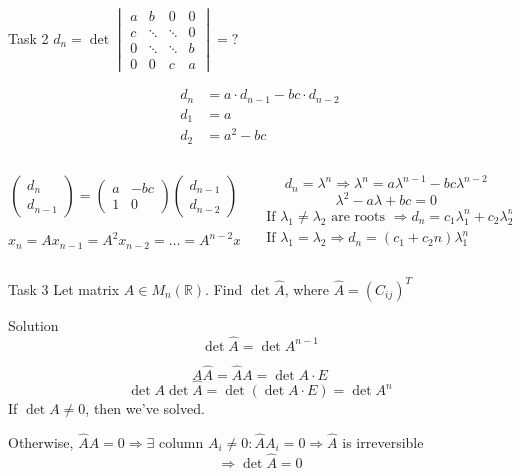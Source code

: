 \documentclass[fullscreen=true, bookmarks=true, hyperref={pdfencoding=unicode}]{beamer}
\begin{document}
\begin{frame}{Task 2}
  $d_n = \det \begin{vmatrix}
    a & b & 0 & 0 \\
    c & \ddots & \ddots & 0 \\
    0 & \ddots & \ddots & b \\
    0 & 0 & c & a 
  \end{vmatrix} = ?$  

  \pause
  \begin{align*}
    d_n &= a \cdot d_{n-1} - bc \cdot d_{n-2} \\
    d_1 &= a \\
    d_2 &= a^2-bc
  \end{align*}
  
  \begin{columns}
    \begin{column}{0.5\paperwidth}
      \pause
      $$\begin{pmatrix}
        d_n \\
        d_{n-1}
      \end{pmatrix} = 
      \begin{pmatrix}
        a & -bc \\
        1 & 0
      \end{pmatrix}  
      \begin{pmatrix}
        d_{n-1} \\
        d_{n-2}
      \end{pmatrix}$$
    
      $$ x_n = A x_{n-1} = A^2 x_{n-2} = \hdots = A^{n-2} x_2 $$          
    \end{column}
    \begin{column}{0.5\paperwidth}
      \pause
      $$d_n = \lambda^n \Rightarrow \lambda^n = a \lambda^{n-1} - bc \lambda^{n-2}$$
      $$\lambda^2 - a \lambda + bc = 0 $$
      \begin{align*} 
        \text{If }\lambda_1 \neq \lambda_2 \text{ are roots } \Rightarrow d_n = c_1\lambda_1^n + c_2\lambda_2^n \\
        \text{If }\lambda_1 = \lambda_2 \Rightarrow d_n = (c_1 + c_2n)\lambda_1^n 
      \end{align*} 
    \end{column}
  \end{columns}
\end{frame}


\begin{frame}{Task 3}
  Let matrix $A \in M_n(\mathbb{R})$. Find $\det \widehat{A}$,
  where $\widehat{A} = (C_{ij})^T$

  \pause
  \begin{block}{Solution}
    \pause
    $$\det \widehat{A} = \det A^{n-1}$$
  
    \pause
    $$A\widehat{A} = \widehat{A} A = \det A \cdot E $$
    $$\det A \det\widehat{A} = \det (\det A \cdot E ) = \det A^n$$
    If $\det A \neq 0$, then we've solved. 

    Otherwise, $\widehat{A} A = 0 \Rightarrow \exists$ column 
    $A_i \neq 0: \widehat{A} A_i = 0 \Rightarrow \widehat{A}$ is irreversible
    $$ \Rightarrow \det \widehat{A} = 0$$
  \end{block}
\end{frame}
\end{document}
